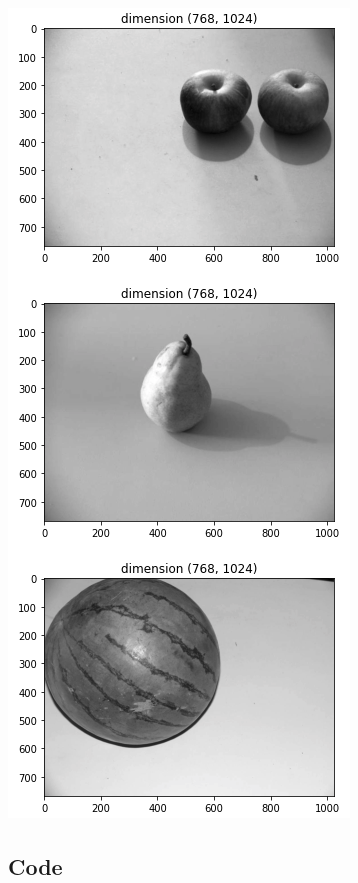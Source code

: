 \documentclass{article}
\begin{document}
\begin{multicols}{2}
\centering
{}
\includegraphics[scale=0.3]{../screenshots/gray.png}

\end{multicols}

\subsection{Code}

\centering
\end{document}
